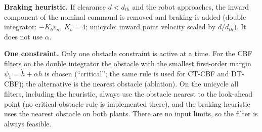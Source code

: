 \textbf{Braking heuristic.} If clearance $d<d_{th}$ and the robot approaches, the inward component of the nominal command is removed and braking is added (double integrator: $-K_b v_n$, $K_b=4$; unicycle: inward point velocity scaled by $d/d_{th}$). It does not use $\alpha$.

\textbf{One constraint.} Only one obstacle constraint is active at a time. For the CBF filters on the double integrator the obstacle with the smallest first-order margin $\psi_1=\dot h+\alpha h$ is chosen (``critical''; the same rule is used for CT-CBF and DT-CBF); the alternative is the nearest obstacle (ablation). On the unicycle all filters, including the heuristic, always use the obstacle nearest to the look-ahead point (no critical-obstacle rule is implemented there), and the braking heuristic uses the nearest obstacle on both plants. There are no input limits, so the filter is always feasible.
